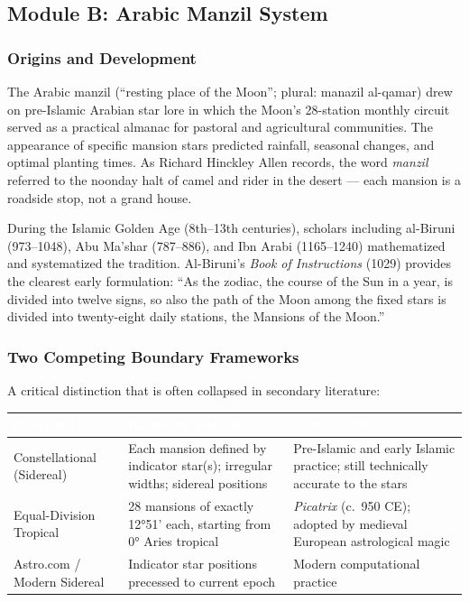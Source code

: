 \documentclass[11pt,letterpaper]{article}
\newcommand{\tableheader}[1]{\textbf{\sffamily\textcolor{white}{#1}}}
\begin{document}
\subsection{Module B: Arabic Manzil System}

\subsubsection{Origins and Development}

The Arabic manzil (``resting place of the Moon''; plural: manazil al-qamar) drew on pre-Islamic Arabian star lore in which the Moon's 28-station monthly circuit served as a practical almanac for pastoral and agricultural communities. The appearance of specific mansion stars predicted rainfall, seasonal changes, and optimal planting times. As Richard Hinckley Allen records, the word \textit{manzil} referred to the noonday halt of camel and rider in the desert --- each mansion is a roadside stop, not a grand house.

During the Islamic Golden Age (8th--13th centuries), scholars including al-Biruni (973--1048), Abu Ma'shar (787--886), and Ibn Arabi (1165--1240) mathematized and systematized the tradition. Al-Biruni's \textit{Book of Instructions} (1029) provides the clearest early formulation: ``As the zodiac, the course of the Sun in a year, is divided into twelve signs, so also the path of the Moon among the fixed stars is divided into twenty-eight daily stations, the Mansions of the Moon.''

\subsubsection{Two Competing Boundary Frameworks}

A critical distinction that is often collapsed in secondary literature:

\begin{center}
\begin{tabularx}{\textwidth}{L{3cm}XX}
\toprule
{}
\tableheader{Framework} & \tableheader{Boundary Definition} & \tableheader{Source / Era} \\
\midrule
Constellational (Sidereal) & Each mansion defined by indicator star(s); irregular widths; sidereal positions & Pre-Islamic and early Islamic practice; still technically accurate to the stars \\
Equal-Division Tropical & 28 mansions of exactly 12°51' each, starting from 0° Aries tropical & \textit{Picatrix} (c.~950 CE); adopted by medieval European astrological magic \\
Astro.com / Modern Sidereal & Indicator star positions precessed to current epoch & Modern computational practice \\
\bottomrule
\end{tabularx}
\end{center}
\end{document}
